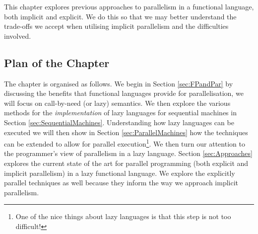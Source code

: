 This chapter explores previous approaches to parallelism in a
functional language, both implicit and explicit. We do this so that
we may better understand the trade-offs we accept when utilising
implicit parallelism and the difficulties involved.

\subsection*{Plan of the Chapter}

The chapter is organised as follows. We begin in Section
\ref{sec:FPandPar} by discussing the benefits that functional languages provide
for parallelisation, we will focus on call-by-need (or lazy) semantics. We then
explore the various methods for the \emph{implementation} of lazy languages for
sequential machines in Section \ref{sec:SequentialMachines}. Understanding how
lazy languages can be executed we will then show in Section
\ref{sec:ParallelMachines} how the techniques can be extended to allow for
parallel execution\footnote{One of the nice things about lazy languages is that
this step is not too difficult!}. We then turn our attention to the
programmer's view of parallelism in a lazy language. Section
\ref{sec:Approaches} explores the current state of the art for parallel
programming (both explicit and implicit parallelism) in a lazy functional
language. We explore the explicitly parallel techniques as well because they
inform the way we approach implicit parallelism.

